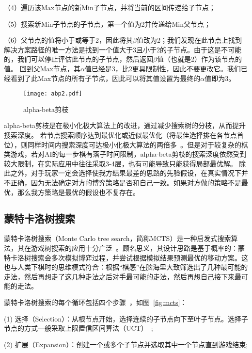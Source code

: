 （4）遍历该Max节点的新Min子节点，并将当前的区间传递给子节点；

（5）搜索新Min子节点的子节点，第一个值为2并传递给Min父节点；

（6）父节点的值将小于或等于2，因此将其$\beta$值改为2；我们发现在此节点上找到解决方案路径的唯一方法是找到一个值大于3且小于2的子节点。由于这是不可能的，我们可以停止评估此节点的子节点，然后返回$\beta$值（也就是2）作为该节点的值。
回到父Max节点，其$\alpha$值已经是3，比2更具限制性，因此不要更改它。我们已经看到了此Max节点的所有子节点，因此可以将其值设置为最终的$\alpha$值即为3。

\begin{figure}[htb]
    \centering
    \texttt{[image: abp2.pdf]}
    \caption[abp2]{%
    alpha-beta剪枝~\cite{russell2010artificial}%
      }
    \label{fig:abp2}
  \end{figure}
\newpage
alpha-beta剪枝是在极小化极大算法上的改进，通过减少搜索树的分枝，从而提升搜索深度。
若节点搜索顺序达到最优化或近似最优化（将最佳选择排在各节点首位），则同样时间内搜索深度可达极小化极大算法的两倍多~\cite{KNUTH1975293abp}。但是对于较复杂的棋类游戏，若对AI的每一步棋有落子时间限制，alpha-beta剪枝的搜索深度依然受到较大限制，在实际应用中往往采取3-4层，也有可能导致只能获得局部最优解。
除此之外，对手玩家一定会选择使我方结果最差的思路的先验假设，在真实情况下并不正确，因为无法确定对方的博弈策略是否和自己一致。如果对方做的策略不是最优，那么我方策略是最优的假设也不复存在。

\subsection{蒙特卡洛树搜索}
蒙特卡洛树搜索（Monte Carlo tree search，简称MCTS）是一种启发式搜索算法，其在游戏树搜索的应用十分广泛~\cite{10.1007/978-3-540-75538-8_7}。顾名思义，其设计思路是基于概率的：蒙特卡洛树搜索会多次模拟博弈过程，并尝试根据模拟结果预测最优的移动方案。这也与人类下棋时的思维模式符合：根据“棋感”在脑海里大致筛选出了几种最可能的走法，然后再想走了这几种走法之后对手最可能的走法，然后再想自己接下来最可能的走法。

蒙特卡洛树搜索的每个循环包括四个步骤~\cite{RePEc:wsi:nmncxx:v:04:y:2008:i:03:n:s1793005708001094}，如图~\ref{fig:mcts}：

(1) 选择（Selection）：从根节点开始，选择连续的子节点向下至叶子节点。选择子节点的方式一般采取上限置信区间算法（UCT）~\cite{10.1007/11871842_29};

(2) 扩展（Expansion）：创建一个或多个子节点并选取其中一个节点直到游戏结束;

